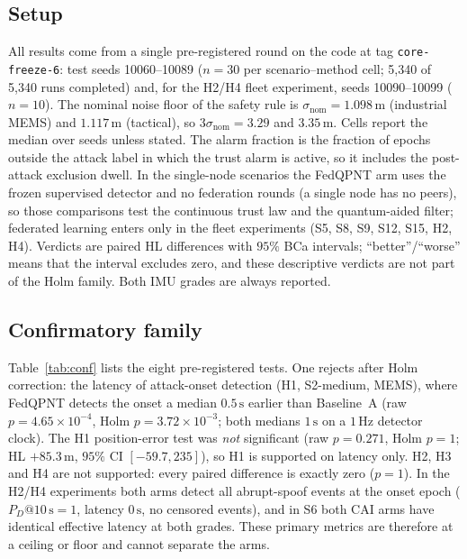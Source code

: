 \documentclass[12pt,a4paper]{article}
\begin{document}
\subsection{Setup}
All results come from a single pre-registered round on the code at tag \texttt{core-freeze-6}: test seeds 10060--10089 ($n=30$ per scenario--method cell; 5{,}340 of 5{,}340 runs completed) and, for the H2/H4 fleet experiment, seeds 10090--10099 ($n=10$). The nominal noise floor of the safety rule is $\sigma_{\mathrm{nom}}=1.098\,\mathrm{m}$ (industrial MEMS) and $1.117\,\mathrm{m}$ (tactical), so $3\sigma_{\mathrm{nom}}=3.29$ and $3.35\,\mathrm{m}$. Cells report the median over seeds unless stated. The alarm fraction is the fraction of epochs outside the attack label in which the trust alarm is active, so it includes the post-attack exclusion dwell. In the single-node scenarios the FedQPNT arm uses the frozen supervised detector and no federation rounds (a single node has no peers), so those comparisons test the continuous trust law and the quantum-aided filter; federated learning enters only in the fleet experiments (S5, S8, S9, S12, S15, H2, H4). Verdicts are paired HL differences with $95\%$ BCa intervals; ``better''/``worse'' means that the interval excludes zero, and these descriptive verdicts are not part of the Holm family. Both IMU grades are always reported.

\subsection{Confirmatory family}
Table~\ref{tab:conf} lists the eight pre-registered tests. One rejects after Holm correction: the latency of attack-onset detection (H1, S2-medium, MEMS), where FedQPNT detects the onset a median $0.5\,\mathrm{s}$ earlier than Baseline~A (raw $p=4.65\times10^{-4}$, Holm $p=3.72\times10^{-3}$; both medians $1\,\mathrm{s}$ on a $1\,\mathrm{Hz}$ detector clock). The H1 position-error test was \emph{not} significant (raw $p=0.271$, Holm $p=1$; HL $+85.3\,\mathrm{m}$, $95\%$ CI $[-59.7,235]$), so H1 is supported on latency only. H2, H3 and H4 are not supported: every paired difference is exactly zero ($p=1$). In the H2/H4 experiments both arms detect all abrupt-spoof events at the onset epoch ($P_D@10\,\mathrm{s}=1$, latency $0\,\mathrm{s}$, no censored events), and in S6 both CAI arms have identical effective latency at both grades. These primary metrics are therefore at a ceiling or floor and cannot separate the arms.
\end{document}
